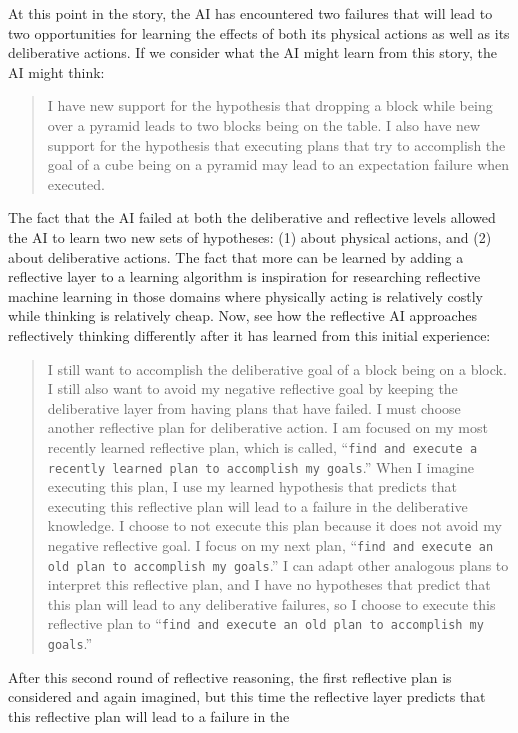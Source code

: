 At this point in the story, the AI has encountered two failures that
will lead to two opportunities for learning the effects of both its
physical actions as well as its deliberative actions.  If we consider
what the AI might learn from this story, the AI might think:
\begin{quote}
  I have new support for the hypothesis that dropping a block while
  being over a pyramid leads to two blocks being on the table.  I also
  have new support for the hypothesis that executing plans that try to
  accomplish the goal of a cube being on a pyramid may lead to an
  expectation failure when executed.
\end{quote}
The fact that the AI failed at both the deliberative and reflective
levels allowed the AI to learn two new sets of hypotheses: (1) about
physical actions, and (2) about deliberative actions.  The fact that
more can be learned by adding a reflective layer to a learning
algorithm is inspiration for researching reflective machine learning
in those domains where physically acting is relatively costly while
thinking is relatively cheap.  Now, see how the reflective AI
approaches reflectively thinking differently after it has learned from
this initial experience:
\begin{quote}
  I still want to accomplish the deliberative goal of a block being on
  a block.  I still also want to avoid my negative reflective goal by
  keeping the deliberative layer from having plans that have failed.
  I must choose another reflective plan for deliberative action.  I am
  focused on my most recently learned reflective plan, which is
  called, ``{\tt{find and execute a recently learned plan to
      accomplish my goals}}.''  When I imagine executing this plan, I
  use my learned hypothesis that predicts that executing this
  reflective plan will lead to a failure in the deliberative
  knowledge.  I choose to not execute this plan because it does not
  avoid my negative reflective goal.  I focus on my next plan,
  ``{\tt{find and execute an old plan to accomplish my goals}}.''  I
  can adapt other analogous plans to interpret this reflective plan,
  and I have no hypotheses that predict that this plan will lead to
  any deliberative failures, so I choose to execute this reflective
  plan to ``{\tt{find and execute an old plan to accomplish my
      goals}}.''
\end{quote}
After this second round of reflective reasoning, the first reflective
plan is considered and again imagined, but this time the reflective
layer predicts that this reflective plan will lead to a failure in the

